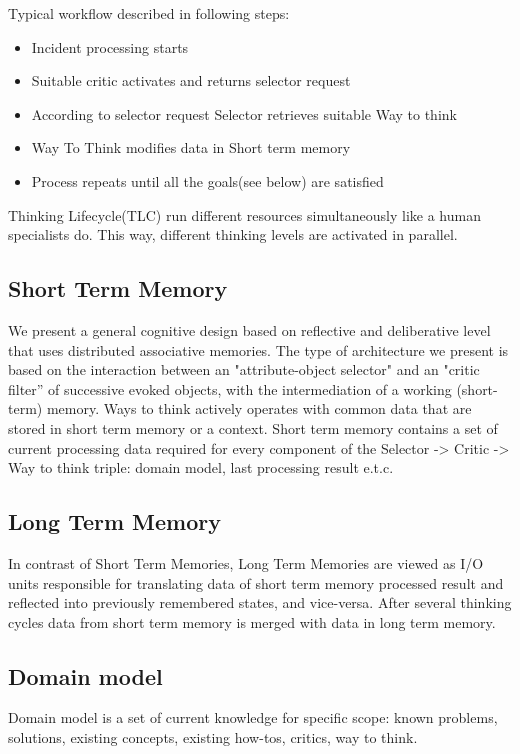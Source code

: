 \documentclass[runningheads,a4paper]{llncs}
\begin{document}
Typical workflow described in following steps:
\begin{itemize}
 \item Incident processing starts
 \item Suitable critic activates and returns selector request
 \item According to selector request Selector retrieves suitable Way to think
 \item Way To Think modifies data in Short term memory
 \item Process repeats until all the goals(see below) are satisfied
\end{itemize}

Thinking Lifecycle(TLC) run different resources simultaneously like a human specialists do. This way, different thinking levels are activated in parallel.

\subsection{Short Term Memory}
We present a general cognitive design based on reflective and deliberative level that uses distributed associative memories. The type of architecture we present is based on the interaction between an "attribute-object selector" and an "critic filter” of successive evoked objects, with the intermediation of a working (short-term) memory.
Ways to think actively operates with common data that are stored in short term memory or a context. Short term memory contains a set of current processing data required for every component of the Selector -> Critic -> Way to think triple: domain model, last processing result e.t.c.

\subsection{Long Term Memory}
In contrast of Short Term Memories, Long Term Memories are viewed as I/O units responsible for translating data of short term memory processed result and reflected into previously remembered states, and vice-versa. After several thinking cycles data from short term memory is merged with data in long term memory.

\subsection{Domain model}
Domain model is a set of current knowledge for specific scope: known problems, solutions, existing concepts, existing how-tos, critics, way to think.\\
\end{document}
